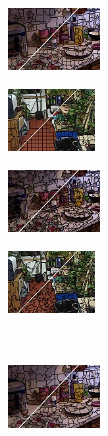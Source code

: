 \begin{figure}
	\begin{subfigure}[b]{0.1375\textwidth}
		\includegraphics[height=1.65cm]{pictures/nyuv2/mss/cropped/mss_00000561_contours}
	\end{subfigure}
	\begin{subfigure}[b]{0.129\textwidth}
		\includegraphics[height=1.65cm]{pictures/sunrgbd/mss/cropped/mss_00004732_contours}
	\end{subfigure}
	\begin{subfigure}[b]{0.02\textwidth}
	\end{subfigure}
	\begin{subfigure}[b]{0.1375\textwidth}
		\includegraphics[height=1.65cm]{pictures/nyuv2/preslic/cropped/preslic_00000561_contours}
	\end{subfigure}
	\begin{subfigure}[b]{0.129\textwidth}
		\includegraphics[height=1.65cm]{pictures/sunrgbd/preslic/cropped/preslic_00004732_contours}
	\end{subfigure}\\
	\begin{subfigure}[b]{0.02\textwidth}
	\end{subfigure}
	\begin{subfigure}[b]{0.1375\textwidth}
		\includegraphics[height=1.65cm]{pictures/nyuv2/wp/cropped/wp_00000561_contours}

\end{subfigure}
\end{figure}
